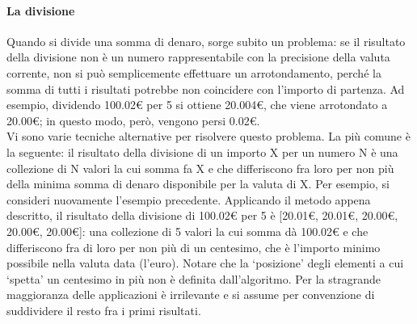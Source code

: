 \paragraph{La divisione}
Quando si divide una somma di denaro, sorge subito un problema: se il risultato della divisione non è un numero rappresentabile con la precisione della valuta corrente, non si può semplicemente effettuare un arrotondamento, perché la somma di tutti i risultati potrebbe non coincidere con l'importo di partenza. Ad esempio, dividendo 100.02€ per 5 si ottiene 20.004€, che viene arrotondato a 20.00€; in questo modo, però, vengono persi 0.02€. \\
Vi sono varie tecniche alternative per risolvere questo problema. La più comune è la seguente: il risultato della divisione di un importo X per un numero N è una collezione di N valori la cui somma fa X e che differiscono fra loro per non più della minima somma di denaro disponibile per la valuta di X. Per esempio, si consideri nuovamente l'esempio precedente. Applicando il metodo appena descritto, il risultato della divisione di 100.02€ per 5 è [20.01€, 20.01€, 20.00€, 20.00€, 20.00€]: una collezione di 5 valori la cui somma dà 100.02€ e che differiscono fra di loro per non più di un centesimo, che è l'importo minimo possibile nella valuta data (l'euro). Notare che la \textquoteleft posizione\textquoteright{} degli elementi a cui \textquoteleft spetta\textquoteright{} un centesimo in più non è definita dall'algoritmo. Per la stragrande maggioranza delle applicazioni è irrilevante e si assume per convenzione di suddividere il resto fra i primi risultati.